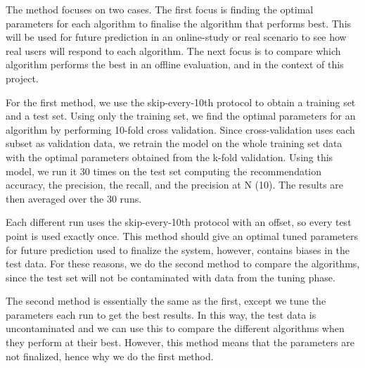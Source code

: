 
The method focuses on two cases. The first focus is finding the optimal parameters for each algorithm to finalise the algorithm that performs best. This will be used for future prediction in an online-study or real scenario to see how real users will respond to each algorithm. The next focus is to compare which algorithm performs the best in an offline evaluation, and in the context of this project.

For the first method, we use the skip-every-10th protocol to obtain a training set and a test set. Using only the training set, we find the optimal parameters for an algorithm by performing 10-fold cross validation. Since cross-validation uses each subset as validation data, we retrain the model on the whole training set data with the optimal parameters obtained from the k-fold validation. Using this model, we run it 30 times on the test set computing the recommendation accuracy, the precision, the recall, and the precision at N (10). The results are then averaged over the 30 runs. 

 Each different run uses the skip-every-10th protocol with an offset, so every test point is used exactly once. This method should give an optimal tuned parameters for future prediction used to finalize the system, however, contains biases in the test data. For these reasons, we do the second method to compare the algorithms, since the test set will not be contaminated with data from the tuning phase.

The second method is essentially the same as the first, except we tune the parameters each run to get the best results. In this way, the test data is uncontaminated and we can use this to compare the different algorithms when they perform at their best. However, this method means that the parameters are not finalized, hence why we do the first method. 



